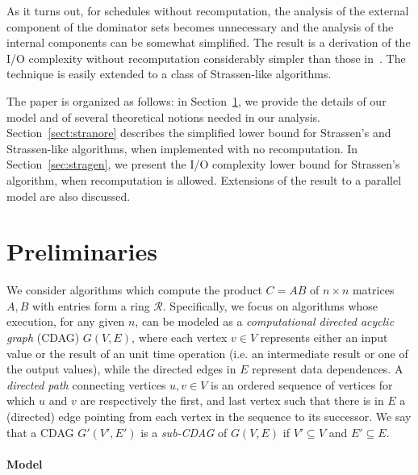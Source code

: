 \documentclass[a4paper,UKenglish]{lipics-v2016}
\newcommand{\ri}{\mathcal{R}}
\newcommand{\io }{I/O }
\begin{document}
As it turns out, for schedules without recomputation, the analysis of
the external component of the dominator sets becomes unnecessary and
the analysis of the internal components can be somewhat simplified.
The result is a derivation of the \io complexity without recomputation
considerably simpler than those in~\cite{ballard2012graph,
  scott2015matrix}.  The technique is easily extended to a class of
Strassen-like algorithms.

The paper is organized as follows: in Section~\ref{sec:preliminaries},
we provide the details of our model and of several theoretical notions
needed in our analysis. Section~\ref{sect:stranore} describes the
simplified lower bound for Strassen's and Strassen-like algorithms,
when implemented with no recomputation. In Section~\ref{sec:stragen}, we present
the \io complexity lower bound for Strassen's algorithm, when
recomputation is allowed. Extensions of the result to a parallel
model are also discussed.


\section{Preliminaries}\label{sec:preliminaries}
We consider algorithms which compute the product $C=AB$ of $n \times
n$ matrices $A,B$ with entries form a ring $\ri$. Specifically, we
focus on algorithms whose execution, for any given $n$, can be modeled
as a \emph{computational directed acyclic graph} (CDAG) $G(V,E)$,
where each vertex $v\in V$ represents either an input value or the
result of an unit time operation (i.e.  an intermediate result or one
of the output values), while the directed edges in $E$ represent data
dependences. A \emph{directed path} connecting vertices $u,v\in V$ is
an ordered sequence of vertices for which $u$ and $v$ are respectively
the first, and last vertex such that there is in $E$ a (directed) edge
pointing from each vertex in the sequence to its successor. We say
that a CDAG $G'(V',E')$ is a \emph{sub-CDAG} of $G(V,E)$ if
$V'\subseteq V$ and $E' \subseteq E$.
\paragraph*{Model}
\end{document}

